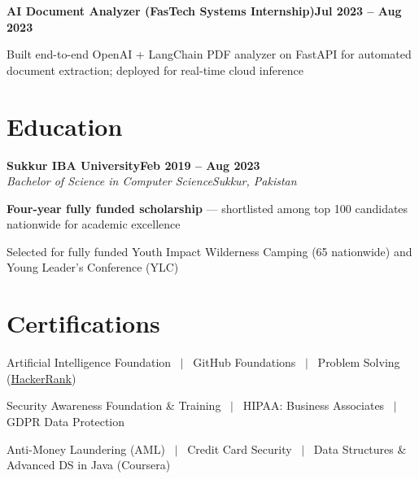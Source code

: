 \documentclass[letterpaper,10pt]{article}
\newcommand{\heading}[2]{
  \hspace{8pt}#1\hfill#2\\
}
\newcommand{\headingBf}[2]{
  \heading{\textbf{#1}}{\textbf{#2}}
}
\newcommand{\headingIt}[2]{
  \heading{\textit{#1}}{\textit{#2}}
}
\newenvironment{resume_list}{
  \vspace{-6pt}
  \begin{itemize}[itemsep=-1px, parsep=0.5pt, topsep=1pt, leftmargin=22pt]
}{
  \end{itemize}
  \vspace{-2pt}
}
\begin{document}
\vspace{2pt}
\headingBf{AI Document Analyzer (FasTech Systems Internship)}{Jul 2023 -- Aug 2023}
\begin{resume_list}
  \item Built end-to-end OpenAI + LangChain PDF analyzer on FastAPI for automated document extraction; deployed for real-time cloud inference
\end{resume_list}

\section{Education}
\headingBf{Sukkur IBA University}{Feb 2019 -- Aug 2023}
\headingIt{Bachelor of Science in Computer Science}{Sukkur, Pakistan}
\begin{resume_list}
  \item \textbf{Four-year fully funded scholarship} --- shortlisted among top 100 candidates nationwide for academic excellence
  \item Selected for fully funded Youth Impact Wilderness Camping (65 nationwide) and Young Leader's Conference (YLC)
\end{resume_list}

\section{Certifications}
\begin{resume_list}
  \item Artificial Intelligence Foundation ~$|$~ GitHub Foundations ~$|$~ Problem Solving (\href{https://www.hackerrank.com/profile/sooraj_bcss19}{HackerRank})
  \item Security Awareness Foundation \& Training ~$|$~ HIPAA: Business Associates ~$|$~ GDPR Data Protection
  \item Anti-Money Laundering (AML) ~$|$~ Credit Card Security ~$|$~ Data Structures \& Advanced DS in Java (Coursera)
\end{resume_list}
\end{document}
